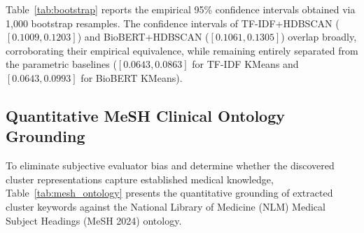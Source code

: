 \documentclass[a4paper,fleqn]{cas-dc}
\begin{document}
\begin{table}[t]
\centering
\caption{Bootstrap 95\% confidence intervals for mean NPMI topic coherence.}
\label{tab:bootstrap}
\end{table}

Table~\ref{tab:bootstrap} reports the empirical 95\% confidence intervals obtained via 1,000 bootstrap resamples. The confidence intervals of TF-IDF+HDBSCAN ($[0.1009, 0.1203]$) and BioBERT+HDBSCAN ($[0.1061, 0.1305]$) overlap broadly, corroborating their empirical equivalence, while remaining entirely separated from the parametric baselines ($[0.0643, 0.0863]$ for TF-IDF KMeans and $[0.0643, 0.0993]$ for BioBERT KMeans).

\subsection{Quantitative MeSH Clinical Ontology Grounding}

To eliminate subjective evaluator bias and determine whether the discovered cluster representations capture established medical knowledge, Table~\ref{tab:mesh_ontology} presents the quantitative grounding of extracted cluster keywords against the National Library of Medicine (NLM) Medical Subject Headings (MeSH 2024) ontology.
\end{document}
